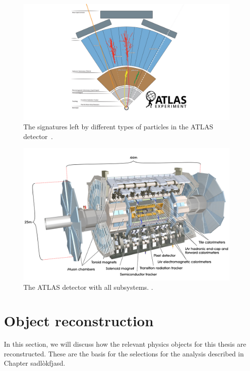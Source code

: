 \documentclass[10pt,a4paper]{book}
\begin{document}
\begin{figure}
    \centering
    \includegraphics[width=0.98\linewidth]{atlas/atlas_particles.png}
    \caption{The signatures left by different types of particles in the ATLAS detector~\cite{Mehlhase:2770815}.}
    \label{signatures}
\end{figure}

\begin{figure}
    \centering
    \includegraphics[width=0.85\linewidth]{atlas/detector.jpg}
    \caption{The ATLAS detector with all subsystems. \cite{Pequenao:1095924}.}
    \label{detector whole}
\end{figure}


\section{Object reconstruction}

In this section, we will discuss how the relevant physics objects for this thesis are reconstructed. These are the basis for the selections for the analysis described in Chapter sadlòkfjasd. 
\end{document}
